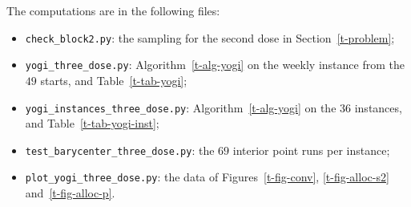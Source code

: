 \documentclass[11pt]{article}
\theoremstyle{plain}
\theoremstyle{remark}
\numberwithin{equation}{section}
\begin{document}
The computations are in the following files:
\begin{itemize}
\item \texttt{check\_block2.py}: the sampling for the second dose in
Section~\ref{t-problem};
\item \texttt{yogi\_three\_dose.py}: Algorithm~\ref{t-alg-yogi} on the weekly
instance from the $49$ starts, and Table~\ref{t-tab-yogi};
\item \texttt{yogi\_instances\_three\_dose.py}: Algorithm~\ref{t-alg-yogi} on
the $36$ instances, and Table~\ref{t-tab-yogi-inst};
\item \texttt{test\_barycenter\_three\_dose.py}: the $69$ interior point runs
per instance;
\item \texttt{plot\_yogi\_three\_dose.py}: the data of
Figures~\ref{t-fig-conv}, \ref{t-fig-alloc-s2} and~\ref{t-fig-alloc-p}.
\end{itemize}



\end{document}
